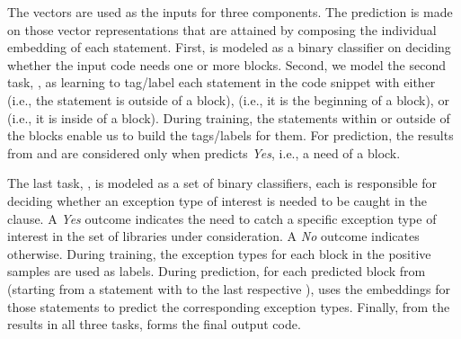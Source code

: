 The vectors are used as the inputs for three components. The
prediction is made on those vector representations that are attained
by composing the individual embedding of each statement. First,
{\xblock} is modeled as a binary classifier on deciding whether the
input code needs one or more  blocks. Second, we model
the second task, {\xstate}, as learning to tag/label each statement in
the code snippet with either  (i.e., the statement is outside
of a  block),  (i.e., it is the beginning
of a block), or  (i.e., it is inside of a 
block).
During training, the statements within or outside of the
 blocks enable us to build the tags/labels for them.
For prediction, the results from {\xstate} and {\xtype} are considered
only when {\xblock} predicts {\em Yes}, i.e., a need of a
 block.

The last task, {\xtype}, is modeled as a set of binary classifiers,
each is responsible for deciding whether an exception type of interest
is needed to be caught in the  clause. A {\em Yes} outcome
indicates the need to catch a specific exception type of interest in
the set of libraries under consideration. A {\em No} outcome indicates
otherwise.  During training, the exception types for each
 block in the positive samples are used as
labels. During prediction, for each predicted block from {\xstate}
(starting from a statement with  to the last respective
), {\xtype} uses the embeddings for those statements to
predict the corresponding exception types. Finally, from the results
in all three tasks, {\tool} forms the final output code.


